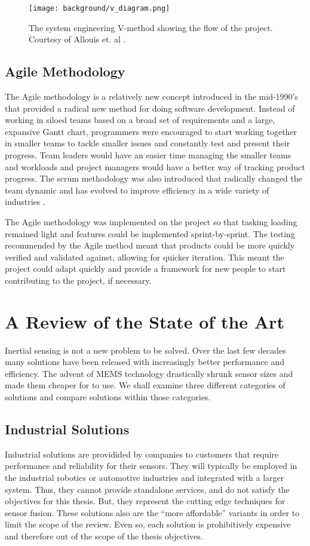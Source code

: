 \begin{figure}
    \centering
    \caption[V-Method Diagram]{The system engineering V-method showing the flow of the project.
    Courtesy of Allouis et. al \cite{Allouis:2013}.}
    \texttt{[image: background/v\_diagram.png]}
\end{figure}

\subsection{Agile Methodology}
The Agile methodology is a relatively new concept introduced in the mid-1990's that provided a radical new method for doing software development.
Instead of working in siloed teams based on a broad set of requirements and a large, expansive Gantt chart, programmers were encouraged to start working together in smaller teams to tackle smaller issues and constantly test and present their progress.
Team leaders would have an easier time managing the smaller teams and workloads and project managers would have a better way of tracking product progress.
The scrum methodology was also introduced that radically changed the team dynamic and has evolved to improve efficiency in a wide variety of industries \cite{Sutherland:2014}.

The Agile methodology was implemented on the project so that tasking loading remained light and features could be implemented sprint-by-sprint.
The testing recommended by the Agile method meant that products could be more quickly verified and validated against, allowing for quicker iteration.
This meant the project could adapt quickly and provide a framework for new people to start contributing to the project, if necessary.

\section{A Review of the State of the Art} 
Inertial sensing is not a new problem to be solved.
Over the last few decades many solutions have been released with increasingly better performance and efficiency.
The advent of MEMS technology drastically shrunk sensor sizes and made them cheaper for to use.
We shall examine three different categories of solutions and compare solutions within those categories.

\subsection{Industrial Solutions} 
Industrial solutions are providided by companies to customers that require performance and reliability for their sensors.
They will typically be employed in the industrial robotics or automotive industries and integrated with a larger system.
Thus, they cannot provide standalone services, and do not satisfy the objectives for this thesis.
But, they represent the cutting edge techniques for sensor fusion.
These solutions also are the ``more affordable'' variants in order to limit the scope of the review.
Even so, each solution is prohibitively expensive and therefore out of the scope of the thesis objectives.

